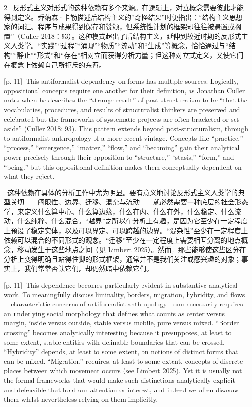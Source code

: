 \documentclass[10pt,a4paper]{article}
\begin{document}
\begin{paracol}{2}
\switchcolumn*
{\scriptsize\color{gray} [p. 11]}\ 反形式主义对形式的这种依赖有多个来源。在逻辑上，对立概念需要彼此才能得到定义。乔纳森·卡勒描述后结构主义的“奇怪结果”时便指出：“结构主义思想家的词汇、程序与成果得到保存和赞颂，但系统性计划的框架却往往被悬置或搁置”（Culler 2018：93）。这种模式超出了后结构主义，延伸到较近时期的反形式主义人类学。“实践”“过程”“涌现”“物质”“流动”和“生成”等概念，恰恰通过与“结构”“静止”“形式”和“存在”相对立而获得分析力量；但这种对立式定义，又使它们在概念上依赖自己所拒斥的东西。\par
\switchcolumn
{\scriptsize\color{gray} [p. 11]}\ This antiformalist dependency on forms has multiple sources. Logically, oppositional concepts require one another for their definition, as Jonathan Culler notes when he describes the “strange result” of post-structuralism to be “that the vocabularies, procedures, and results of structuralist thinkers are preserved and celebrated but the frameworks of systematic projects are often bracketed or set aside” (Culler 2018: 93). This pattern extends beyond post-structuralism, through to antiformalist anthropology of a more recent vintage. Concepts like “practice,” “process,” “emergence,” “matter,” “flow,” and “becoming” gain their analytical power precisely through their opposition to “structure,” “stasis,” “form,” and “being,” but this oppositional definition makes them conceptually dependent on what they reject.\par
\switchcolumn*
{\scriptsize\color{gray} [p. 11]}\ 这种依赖在具体的分析工作中尤为明显。要有意义地讨论反形式主义人类学的典型关切——阈限性、边界、迁移、混杂与流动——就必然需要一种底层的社会形态学，来定义什么算中心、什么算边缘，什么在内、什么在外，什么稳定、什么流动，什么纯粹、什么混合。“越界”之所以在分析上有趣，是因为它至少在一定程度上预设了稳定实体，以及可以界定、可以跨越的边界。“混杂性”至少在一定程度上依赖可以混合的不同形式的观念。“迁移”至少在一定程度上需要相互分离的地点概念，移动发生于这些地点之间（见 Limbert 2025）。然而，那些能够使这些区分在分析上变得明确且站得住脚的形式框架，通常并不是我们关注或感兴趣的对象；事实上，我们常常否认它们，却仍然暗中依赖它们。\par
\switchcolumn
{\scriptsize\color{gray} [p. 11]}\ This dependence becomes particularly evident in substantive analytical work. To meaningfully discuss liminality, borders, migration, hybridity, and flows—characteristic concerns of antiformalist anthropology—one necessarily requires an underlying social morphology that defines what counts as center versus margin, inside versus outside, stable versus mobile, pure versus mixed. “Border crossing” becomes analytically interesting because it presupposes, at least to some extent, stable entities with definable boundaries that can be crossed. “Hybridity” depends, at least to some extent, on notions of distinct forms that can be mixed. “Migration” requires, at least to some extent, concepts of discrete places between which movement occurs (see Limbert 2025). Yet it is usually not the formal frameworks that would make such distinctions analytically explicit and defensible that hold our attention or interest, and indeed we often disavow them whilst nevertheless relying on them implicitly.\par

\end{paracol}
\end{document}

